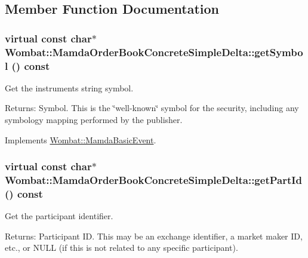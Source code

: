 \subsection{Member Function Documentation}
\hypertarget{classWombat_1_1MamdaOrderBookConcreteSimpleDelta_93de17fbb8e02253ea7c67e19c2da6a4}{
\subsubsection[getSymbol]{\setlength{\rightskip}{0pt plus 5cm}virtual const char$\ast$ Wombat::Mamda\-Order\-Book\-Concrete\-Simple\-Delta::get\-Symbol () const}}
\label{classWombat_1_1MamdaOrderBookConcreteSimpleDelta_93de17fbb8e02253ea7c67e19c2da6a4}


Get the instruments string symbol. 

\begin{Desc}
\item[Returns:]Symbol. This is the \char`\"{}well-known\char`\"{} symbol for the security, including any symbology mapping performed by the publisher. \end{Desc}


Implements \hyperlink{classWombat_1_1MamdaBasicEvent_8783b136a1305d21c578ced8618c090b}{Wombat::Mamda\-Basic\-Event}.\hypertarget{classWombat_1_1MamdaOrderBookConcreteSimpleDelta_ae9efb06f1eeb2d5bd36c97639703627}{
\subsubsection[getPartId]{\setlength{\rightskip}{0pt plus 5cm}virtual const char$\ast$ Wombat::Mamda\-Order\-Book\-Concrete\-Simple\-Delta::get\-Part\-Id () const}}
\label{classWombat_1_1MamdaOrderBookConcreteSimpleDelta_ae9efb06f1eeb2d5bd36c97639703627}


Get the participant identifier. 

\begin{Desc}
\item[Returns:]Participant ID. This may be an exchange identifier, a market maker ID, etc., or NULL (if this is not related to any specific participant). \end{Desc}


